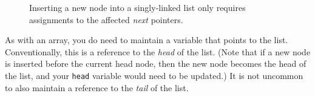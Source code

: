 \begin{figure}[h]
    \centering
    \caption{Inserting a new node into a singly-linked list only requires assignments to the affected \textit{next} pointers.}\label{fig:sll-insertion}
\end{figure}

As with an array, you do need to maintain a variable that points to the list.
Conventionally, this is a reference to the \textit{head} of the list.
(Note that if a new node is inserted before the current head node, then the new node becomes the head of the list, and your \lstinline{head} variable would need to be updated.)
It is not uncommon to also maintain a reference to the \textit{tail} of the list.

%
%
%


